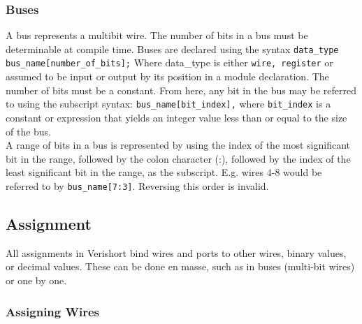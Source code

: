 \documentclass[letterpaper,11pt]{article}
\begin{document}
        \subsubsection{Buses}
        \indent A bus represents a multibit wire. The number of bits in a bus must be determinable at compile 
        time. Buses are declared using the syntax \texttt{data\_type bus\_name[number\_of\_bits];} Where 
        data\_type is either \texttt{wire, register} or assumed to be input or output by its position in a module 
        declaration. The number of bits must be a constant. From here, any bit in the bus may be referred 
        to using the subscript syntax: \texttt{bus\_name[bit\_index],} where \texttt{bit\_index} is a constant or expression 
        that yields an integer value less than or equal to the size of the bus. \\
        \indent A range of bits in a bus is represented by using the index of the most significant bit in the 
        range, followed by the colon character (:), followed by the index of the least significant 
        bit in the range, as the subscript. E.g. wires 4-8 would be referred to by \texttt{bus\_name[7:3]}. 
        Reversing this order is invalid.
        
    \subsection{Assignment}
    All assignments in Verishort bind wires and ports to other wires, binary values, or decimal values. 
    These can be done en masse, such as in buses (multi-bit wires) or one by one.
    
        \subsubsection{Assigning Wires}
        
\end{document}
